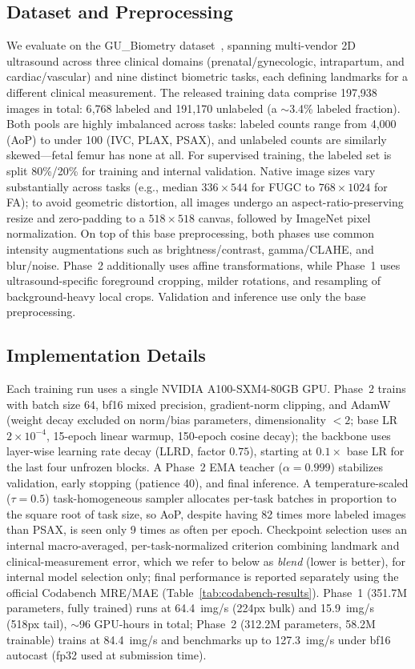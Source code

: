 \documentclass[runningheads]{llncs}
\begin{document}
\subsection{Dataset and Preprocessing}
\label{sec:dataset}
We evaluate on the GU\_Biometry dataset~\cite{gu_biometry}, spanning multi-vendor 2D ultrasound across three clinical domains (prenatal/gynecologic, intrapartum, and cardiac/vascular) and nine distinct biometric tasks, each defining landmarks for a different clinical measurement. The released training data comprise 197{,}938 images in total: 6{,}768 labeled and 191{,}170 unlabeled (a $\sim$3.4\% labeled fraction). Both pools are highly imbalanced across tasks: labeled counts range from 4{,}000 (AoP) to under 100 (IVC, PLAX, PSAX), and unlabeled counts are similarly skewed---fetal femur has none at all. For supervised training, the labeled set is split 80\%/20\% for training and internal validation. Native image sizes vary substantially across tasks (e.g., median $336\times544$ for FUGC to $768\times1024$ for FA); to avoid geometric distortion, all images undergo an aspect-ratio-preserving resize and zero-padding to a $518\times518$ canvas, followed by ImageNet pixel normalization. On top of this base preprocessing, both phases use common intensity augmentations such as brightness/contrast, gamma/CLAHE, and blur/noise. Phase~2 additionally uses affine transformations, while Phase~1 uses ultrasound-specific foreground cropping, milder rotations, and resampling of background-heavy local crops. Validation and inference use only the base preprocessing.

\subsection{Implementation Details}
Each training run uses a single NVIDIA A100-SXM4-80GB GPU. Phase~2 trains with batch size 64, bf16 mixed precision, gradient-norm clipping, and AdamW (weight decay excluded on norm/bias parameters, dimensionality $<2$; base LR $2\times10^{-4}$, 15-epoch linear warmup, 150-epoch cosine decay); the backbone uses layer-wise learning rate decay (LLRD, factor $0.75$), starting at $0.1\times$ base LR for the last four unfrozen blocks. A Phase~2 EMA teacher ($\alpha=0.999$) stabilizes validation, early stopping (patience 40), and final inference. A temperature-scaled ($\tau=0.5$) task-homogeneous sampler allocates per-task batches in proportion to the square root of task size, so AoP, despite having 82 times more labeled images than PSAX, is seen only 9 times as often per epoch. Checkpoint selection uses an internal macro-averaged, per-task-normalized criterion combining landmark and clinical-measurement error, which we refer to below as \emph{blend} (lower is better), for internal model selection only; final performance is reported separately using the official Codabench MRE/MAE (Table~\ref{tab:codabench-results}). Phase~1 (351.7M parameters, fully trained) runs at 64.4~img/s (224px bulk) and 15.9~img/s (518px tail), $\sim$96 GPU-hours in total; Phase~2 (312.2M parameters, 58.2M trainable) trains at 84.4~img/s and benchmarks up to 127.3~img/s under bf16 autocast (fp32 used at submission time).
\end{document}
